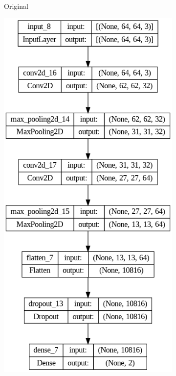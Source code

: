 \documentclass{thesisreport}
\begin{document}
\begin{figure}[h]
\begin{subfigure}[b]{0.2\linewidth}
    \caption{Original}
  \end{subfigure}
  \begin{subfigure}[b]{0.2\linewidth}
    \includegraphics[width=\linewidth]{figures/model_wider.png}

\end{subfigure}
\end{figure}
\end{document}

